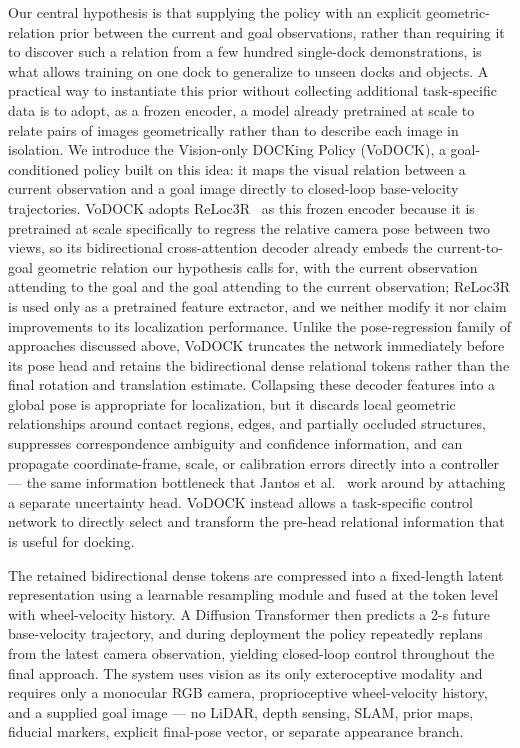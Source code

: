 \documentclass[letterpaper, 10 pt, conference]{IEEEtran}  %
\begin{document}
Our central hypothesis is that supplying the policy with an explicit geometric-relation prior between the current and goal observations, rather than requiring it to discover such a relation from a few hundred single-dock demonstrations, is what allows training on one dock to generalize to unseen docks and objects. A practical way to instantiate this prior without collecting additional task-specific data is to adopt, as a frozen encoder, a model already pretrained at scale to relate pairs of images geometrically rather than to describe each image in isolation. We introduce the Vision-only DOCKing Policy (VoDOCK), a goal-conditioned policy built on this idea: it maps the visual relation between a current observation and a goal image directly to closed-loop base-velocity trajectories. VoDOCK adopts ReLoc3R~\cite{c4} as this frozen encoder because it is pretrained at scale specifically to regress the relative camera pose between two views, so its bidirectional cross-attention decoder already embeds the current-to-goal geometric relation our hypothesis calls for, with the current observation attending to the goal and the goal attending to the current observation; ReLoc3R is used only as a pretrained feature extractor, and we neither modify it nor claim improvements to its localization performance. Unlike the pose-regression family of approaches discussed above, VoDOCK truncates the network immediately before its pose head and retains the bidirectional dense relational tokens rather than the final rotation and translation estimate. Collapsing these decoder features into a global pose is appropriate for localization, but it discards local geometric relationships around contact regions, edges, and partially occluded structures, suppresses correspondence ambiguity and confidence information, and can propagate coordinate-frame, scale, or calibration errors directly into a controller --- the same information bottleneck that Jantos et al.~\cite{jantos2025aleatoric} work around by attaching a separate uncertainty head. VoDOCK instead allows a task-specific control network to directly select and transform the pre-head relational information that is useful for docking.

The retained bidirectional dense tokens are compressed into a fixed-length latent representation using a learnable resampling module and fused at the token level with wheel-velocity history. A Diffusion Transformer then predicts a 2-s future base-velocity trajectory, and during deployment the policy repeatedly replans from the latest camera observation, yielding closed-loop control throughout the final approach. The system uses vision as its only exteroceptive modality and requires only a monocular RGB camera, proprioceptive wheel-velocity history, and a supplied goal image --- no LiDAR, depth sensing, SLAM, prior maps, fiducial markers, explicit final-pose vector, or separate appearance branch.
\end{document}
